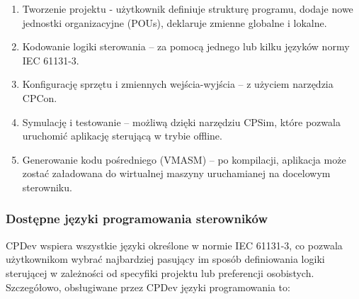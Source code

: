 \documentclass[12pt,twoside]{article}
\begin{document}
\begin{enumerate}[label=\arabic*), leftmargin=1.25cm]
    \item Tworzenie projektu - użytkownik definiuje strukturę programu, dodaje nowe jednostki organizacyjne (POUs), deklaruje zmienne globalne i lokalne.
    \item Kodowanie logiki sterowania -- za pomocą jednego lub kilku języków normy IEC 61131-3.
    \item Konfigurację sprzętu i zmiennych wejścia-wyjścia -- z użyciem narzędzia CPCon.
    \item Symulację i testowanie -- możliwą dzięki narzędziu CPSim, które pozwala uruchomić aplikację sterującą w trybie offline.
    \item Generowanie kodu pośredniego (VMASM) -- po kompilacji, aplikacja może zostać załadowana do wirtualnej maszyny uruchamianej na docelowym sterowniku.
\end{enumerate}

\subsubsection{Dostępne języki programowania sterowników}
CPDev wspiera wszystkie języki określone w normie IEC 61131-3\cite{iec61131-3}, co pozwala użytkownikom wybrać najbardziej pasujący im sposób definiowania logiki sterującej w zależności od specyfiki projektu lub preferencji osobistych. Szczegółowo, obsługiwane przez CPDev języki programowania  to\cite{cpdevLanguages}:
\end{document}
